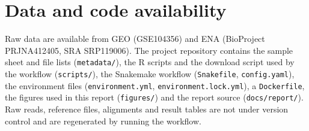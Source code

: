 \documentclass[11pt, a4paper]{article}
\begin{document}
\section*{Data and code availability}
Raw data are available from GEO (GSE104356) and ENA (BioProject PRJNA412405, SRA SRP119006). The project repository contains the sample sheet and file lists (\texttt{metadata/}), the R scripts and the download script used by the workflow (\texttt{scripts/}), the Snakemake workflow (\texttt{Snakefile}, \texttt{config.yaml}), the environment files (\texttt{environment.yml}, \texttt{environment.lock.yml}), a \texttt{Dockerfile}, the figures used in this report (\texttt{figures/}) and the report source (\texttt{docs/report/}). Raw reads, reference files, alignments and result tables are not under version control and are regenerated by running the workflow.

\printbibliography[heading=bibintoc]
\end{document}

